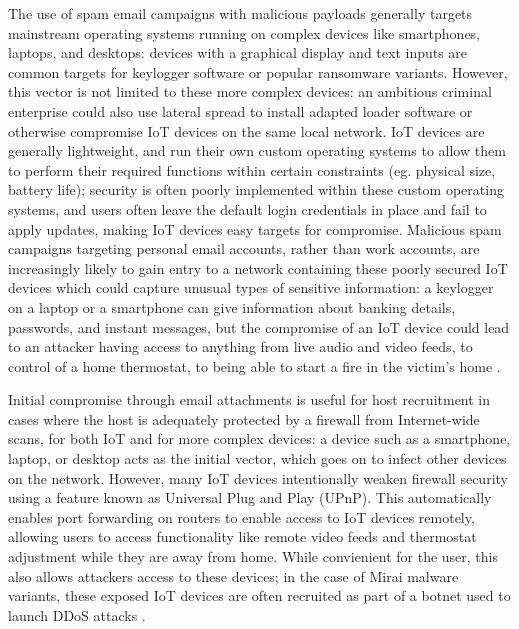 \documentclass[10pt,sigconf]{acmart}
\begin{document}
The use of spam email campaigns with malicious payloads generally targets mainstream operating systems running on complex devices like smartphones, laptops, and desktops: devices with a graphical display and text inputs are common targets for keylogger software or popular ransomware variants.
However, this vector is not limited to these more complex devices: an ambitious criminal enterprise could also use lateral spread to install adapted loader software or otherwise compromise IoT devices on the same local network.
IoT devices are generally lightweight, and run their own custom operating systems to allow them to perform their required functions within certain constraints (eg. physical size, battery life);
security is often poorly implemented within these custom operating systems, and users often leave the default login credentials in place and fail to apply updates, making IoT devices easy targets for compromise.
Malicious spam campaigns targeting personal email accounts, rather than work accounts, are increasingly likely to gain entry to a network containing these poorly secured IoT devices which could capture unusual types of sensitive information:
a keylogger on a laptop or a smartphone can give information about banking details, passwords, and instant messages, but the compromise of an IoT device could lead to an attacker having access to anything from live audio and video feeds, to control of a home thermostat, to being able to start a fire in the victim's home \cite{candletouch}.

Initial compromise through email attachments is useful for host recruitment in cases where the host is adequately protected by a firewall from Internet-wide scans, for both IoT and for more complex devices:
a device such as a smartphone, laptop, or desktop acts as the initial vector, which goes on to infect other devices on the network.
However, many IoT devices intentionally weaken firewall security using a feature known as Universal Plug and Play (UPnP).
This automatically enables port forwarding on routers to enable access to IoT devices remotely, allowing users to access functionality like remote video feeds and thermostat adjustment while they are away from home.
While convienient for the user, this also allows attackers access to these devices;
in the case of Mirai malware variants, these exposed IoT devices are often recruited as part of a botnet used to launch DDoS attacks \cite{mirai-traffic}.
\end{document}
